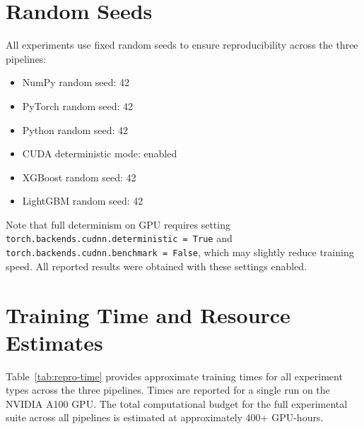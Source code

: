 \section{Random Seeds}

All experiments use fixed random seeds to ensure reproducibility across the three pipelines:
\begin{itemize}
\item NumPy random seed: 42
\item PyTorch random seed: 42
\item Python random seed: 42
\item CUDA deterministic mode: enabled
\item XGBoost random seed: 42
\item LightGBM random seed: 42
\end{itemize}

\noindent Note that full determinism on GPU requires setting \texttt{torch.backends.cudnn.deterministic = True} and \texttt{torch.backends.cudnn.benchmark = False}, which may slightly reduce training speed. All reported results were obtained with these settings enabled.

\section{Training Time and Resource Estimates}

Table~\ref{tab:repro-time} provides approximate training times for all experiment types across the three pipelines. Times are reported for a single run on the NVIDIA A100 GPU. The total computational budget for the full experimental suite across all pipelines is estimated at approximately 400+ GPU-hours.

